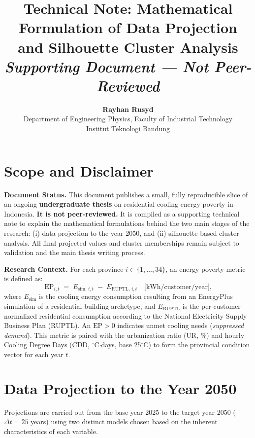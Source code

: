 \documentclass[11pt,a4paper]{article}
\title{\textbf{Technical Note: Mathematical Formulation of Data Projection and Silhouette Cluster Analysis}\\[0.3cm]
\large \textit{Supporting Document --- Not Peer-Reviewed}}
\author{
\textbf{Rayhan Rusyd}\\[2pt]
Department of Engineering Physics, Faculty of Industrial Technology\\
Institut Teknologi Bandung\\[2pt]
}
\date{}
\begin{document}
\maketitle

\section*{Scope and Disclaimer}

\noindent
\textbf{Document Status.} This document publishes a small, fully reproducible slice of an ongoing \textbf{undergraduate thesis} on residential cooling energy poverty in Indonesia. \textbf{It is not peer-reviewed.} It is compiled as a supporting technical note to explain the mathematical formulations behind the two main stages of the research: (i) data projection to the year 2050, and (ii) silhouette-based cluster analysis. All final projected values and cluster memberships remain subject to validation and the main thesis writing process.

\noindent
\textbf{Research Context.} For each province $i \in \{1,\dots,34\}$, an energy poverty metric is defined as:
\begin{equation}
\mathrm{EP}_{i,t} \;=\; E_{\mathrm{sim},\,i,t} \;-\; E_{\mathrm{RUPTL},\,i,t}
\quad \text{[kWh/customer/year],}
\label{eq:ep}
\end{equation}
where $E_{\mathrm{sim}}$ is the cooling energy consumption resulting from an EnergyPlus simulation of a residential building archetype, and $E_{\mathrm{RUPTL}}$ is the per-customer normalized residential consumption according to the National Electricity Supply Business Plan (RUPTL). An $\mathrm{EP}>0$ indicates unmet cooling needs (\emph{suppressed demand}). This metric is paired with the urbanization ratio (UR, \%) and hourly Cooling Degree Days (CDD, ${}^\circ$C$\cdot$days, base 25${}^\circ$C) to form the provincial condition vector for each year $t$.

\section{Data Projection to the Year 2050}
Projections are carried out from the base year 2025 to the target year 2050 ($\Delta t = 25$ years) using two distinct models chosen based on the inherent characteristics of each variable.
\end{document}
